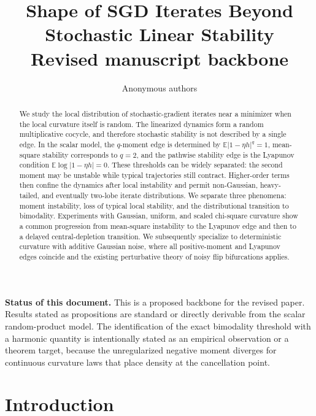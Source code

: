 \documentclass[11pt]{article}
\title{\vspace{-1.2em}\textbf{Shape of SGD Iterates Beyond Stochastic Linear Stability}\\
\large Revised manuscript backbone}
\author{Anonymous authors}
\date{}
\newcommand{\E}{\mathbb{E}}
\begin{document}
\maketitle
\vspace{-1.5em}

\begin{abstract}
We study the local distribution of stochastic-gradient iterates near a minimizer when the local curvature itself is random.  The linearized dynamics form a random multiplicative cocycle, and therefore stochastic stability is not described by a single edge.  In the scalar model, the $q$-moment edge is determined by $\E|1-\eta h|^q=1$, mean-square stability corresponds to $q=2$, and the pathwise stability edge is the Lyapunov condition $\E\log|1-\eta h|=0$.  These thresholds can be widely separated: the second moment may be unstable while typical trajectories still contract.  Higher-order terms then confine the dynamics after local instability and permit non-Gaussian, heavy-tailed, and eventually two-lobe iterate distributions.  We separate three phenomena: moment instability, loss of typical local stability, and the distributional transition to bimodality.  Experiments with Gaussian, uniform, and scaled chi-square curvature show a common progression from mean-square instability to the Lyapunov edge and then to a delayed central-depletion transition.  We subsequently specialize to deterministic curvature with additive Gaussian noise, where all positive-moment and Lyapunov edges coincide and the existing perturbative theory of noisy flip bifurcations applies.
\end{abstract}

\noindent\colorbox{softorange}{\parbox{0.965\linewidth}{\textbf{Status of this document.} This is a proposed backbone for the revised paper.  Results stated as propositions are standard or directly derivable from the scalar random-product model.  The identification of the exact bimodality threshold with a harmonic quantity is intentionally stated as an empirical observation or a theorem target, because the unregularized negative moment diverges for continuous curvature laws that place density at the cancellation point.}}

\section{Introduction}
\end{document}
